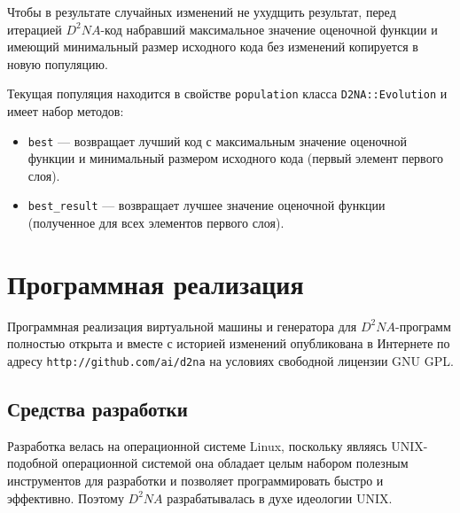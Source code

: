 \documentclass[utf8,a5paper,portrait,10pt]{eskdtext}
\begin{document}
Чтобы в результате случайных изменений не ухудщить результат, перед итерацией
$D^2NA$-код набравший максимальное значение оценочной функции и имеющий
минимальный размер исходного кода без изменений копируется в новую популяцию.

Текущая популяция находится в свойстве \texttt{population} класса
\texttt{D2NA::Evolution} и имеет набор методов:
\begin{itemize}
  \item \texttt{best} — возвращает лучший код с максимальным значение оценочной
        функции и минимальный размером исходного кода (первый элемент первого
        слоя).
  \item \texttt{best\_result} — возвращает лучшее значение оценочной функции
        (полученное для всех элементов первого слоя).
\end{itemize}

\newpage
\section{Программная реализация}

Программная реализация виртуальной машины и генератора для $D^2NA$-программ
полностью открыта и  вместе с историей изменений опубликована в Интернете по
адресу \texttt{http://github.com/ai/d2na} на условиях свободной лицензии
GNU GPL.

\subsection{Средства разработки}

Разработка велась на операционной системе Linux, поскольку являясь UNIX-подобной
операционной системой она обладает целым набором полезным инструментов для
разработки и позволяет программировать быстро и эффективно. Поэтому $D^2NA$
разрабатывалась в духе идеологии UNIX.
\end{document}
